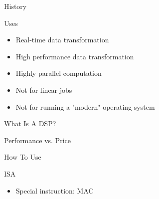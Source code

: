 \documentclass{beamer}
\begin{document}
\begin{frame}{History}
\end{frame}

\begin{frame}{Uses}
    \begin{itemize}
        \item Real-time data transformation %
        \item High performance data transformation %
        \item Highly parallel computation %
        \item Not for linear jobs %
        \item Not for running a "modern" operating system %
    \end{itemize}
\end{frame}

\begin{frame}{What Is A DSP?}
\end{frame}

\begin{frame}{Performance vs. Price}
\end{frame}

\begin{frame}{How To Use}
\end{frame}

\begin{frame}{ISA}
    \begin{itemize}
        \item Special instruction: MAC
    \end{itemize}
\end{frame}
\end{document}
